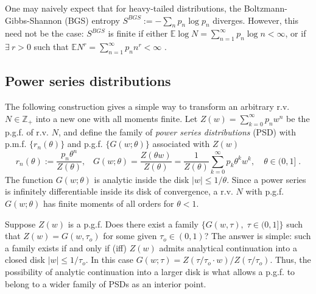 \documentclass[a4paper,12pt]{amsart}
\newcommand{\Z}{\mathbb{Z}_{+}}
\theoremstyle{definition}
\theoremstyle{remark}
\begin{document}
One may naively expect that for heavy-tailed distributions, the Boltzmann-Gibbs-Shannon (BGS) entropy $S^{BGS}:=-\sum_n p_n \log p_n$ diverges. However, this need not be the case: $S^{BGS}$ is finite if either $\mathbb{E} \log N  = \sum_{n=1}^{\infty}p_n \log n < \infty $, or if $\exists ~r> 0$ such that $\mathbb{E} N^{r} = \sum_{n=1}^{\infty}p_n n^{r}< \infty$ \cite{Baccetti_2013}. 


\subsection{Power series distributions} \label{psdsub}
The following construction gives a simple way to transform an arbitrary r.v. $N\in \Z$ into a new one with all moments finite. Let $Z(w)=\sum_{k=0}^{\infty}p_n w^n$ be the p.g.f. of r.v. $N$, and define the family of {\it power series distributions} (PSD) \cite{JKK2005} with p.m.f. $\{r_n(\theta)\}$ and p.g.f. $\{G(w;\theta)\}$ associated with $Z(w)$ 
\begin{equation} \label{PSDdef}
r_n(\theta):=\frac{p_n \theta^n}{Z(\theta)},\;\;\;
G(w;\theta) =\frac{Z(\theta w)}{Z(\theta)} =\frac{1}{Z(\theta)}\sum_{k=0}^{\infty}p_k\theta^kw^k, \quad \theta \in (0,1] \;.
\end{equation}
The function $G(w;\theta)$ is analytic inside the disk $|w|\leq 1/\theta$. Since a power series is infinitely differentiable inside its disk of convergence, a r.v. $N$ with p.g.f. $G(w;\theta)$ has finite moments of all orders for $\theta <1$.

Suppose $Z(w)$ is a p.g.f. Does there exist a family $\{G(w,\tau), \; \tau \in (0,1]\}$ such that $Z(w) = G(w,\tau_o)$ for some given $\tau_o \in (0,1)$? The answer is simple: such a family exists if and only if (iff) $Z(w)$ admits analytical continuation into a closed disk $|w| \leq 1/\tau_o$. In this case $G(w;\tau) =Z(\tau/\tau_o\cdot w)/Z(\tau/\tau_o)$. Thus, the possibility of analytic continuation into a larger disk is what allows a p.g.f. to belong to a wider family of PSDs as an interior point. 
\end{document}
